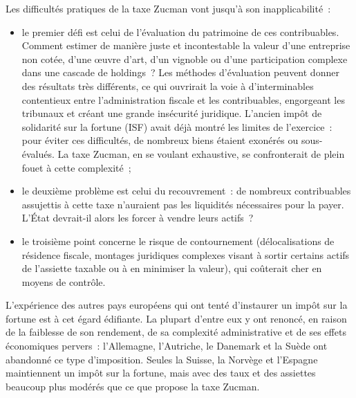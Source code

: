 Les difficultés pratiques de la taxe Zucman vont jusqu'à son inapplicabilité~:
\begin{itemize}
  \item le premier défi est celui de l'évaluation du patrimoine de ces
    contribuables. Comment estimer de manière juste et incontestable la valeur
    d'une entreprise non cotée, d'une œuvre d'art, d'un vignoble ou d'une
    participation complexe dans une cascade de holdings~? Les méthodes
    d'évaluation peuvent donner des résultats très différents, ce qui ouvrirait
    la voie à d'interminables contentieux entre l'administration fiscale et les
    contribuables, engorgeant les tribunaux et créant une grande insécurité
    juridique. L'ancien impôt de solidarité sur la fortune (ISF) avait déjà
    montré les limites de l'exercice~: pour éviter ces difficultés, de nombreux
    biens étaient exonérés ou sous-évalués. La taxe Zucman, en se voulant
    exhaustive, se confronterait de plein fouet à cette complexité~;
  \item le deuxième problème est celui du recouvrement~: de nombreux
    contribuables assujettis à cette taxe n'auraient pas les liquidités
    nécessaires pour la payer. L'État devrait-il alors les forcer à vendre leurs
    actifs~?
  \item le troisième point concerne le risque de contournement (délocalisations
    de résidence fiscale, montages juridiques complexes visant à sortir certains
    actifs de l'assiette taxable ou à en minimiser la valeur), qui coûterait
    cher en moyens de contrôle.
\end{itemize}
L'expérience des autres pays européens qui ont tenté d'instaurer un impôt sur la
fortune est à cet égard édifiante. La plupart d'entre eux y ont renoncé, en
raison de la faiblesse de son rendement, de sa complexité administrative et de
ses effets économiques pervers~: l'Allemagne, l'Autriche, le Danemark et la
Suède ont abandonné ce type d'imposition. Seules la Suisse, la Norvège et
l'Espagne maintiennent un impôt sur la fortune, mais avec des taux et des
assiettes beaucoup plus modérés que ce que propose la taxe Zucman.

